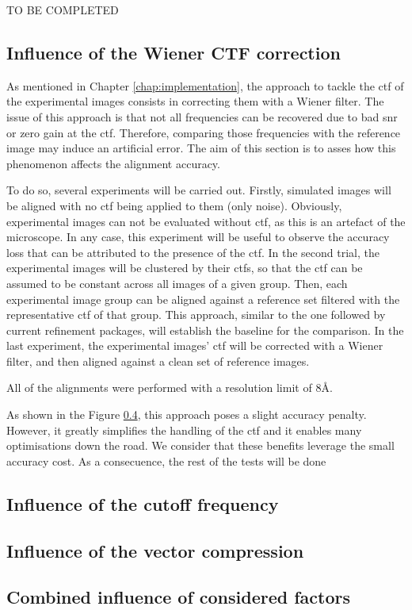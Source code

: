 \documentclass[../main.tex]{subfiles}
\begin{document}
TO BE COMPLETED

\subsection{Influence of the Wiener CTF correction}
As mentioned in Chapter \ref{chap:implementation}, the approach to tackle the \gls{ctf} of the experimental images consists in correcting them with a Wiener filter. The issue of this approach is that not all frequencies can be recovered due to bad \gls{snr} or zero gain at the \gls{ctf}. Therefore, comparing those frequencies with the reference image may induce an artificial error. The aim of this section is to asses how this phenomenon affects the alignment accuracy.

To do so, several experiments will be carried out. Firstly, simulated images will be aligned with no \gls{ctf} being applied to them (only noise). Obviously, experimental images can not be evaluated without \gls{ctf}, as this is an artefact of the microscope. In any case, this experiment will be useful to observe the accuracy loss that can be attributed to the presence of the \gls{ctf}. In the second trial, the experimental images will be clustered by their \glspl{ctf}, so that the \gls{ctf} can be assumed to be constant across all images of a given group. Then, each experimental image group can be aligned against a reference set filtered with the representative \gls{ctf} of that group. This approach, similar to the one followed by current refinement packages, will establish the baseline for the comparison.  In the last experiment, the experimental images' \gls{ctf} will be corrected with a Wiener filter, and then aligned against a clean set of reference images. 

All of the alignments were performed with a resolution limit of $8 \si{\angstrom}$.

As shown in the Figure \ref{}, this approach poses a slight accuracy penalty. However, it greatly simplifies the handling of the \gls{ctf} and it enables many optimisations down the road. We consider that these benefits leverage the small accuracy cost. As a consecuence, the rest of the tests will be done 

\subsection{Influence of the cutoff frequency}

\subsection{Influence of the vector compression}

\subsection{Combined influence of considered factors}
\end{document}
